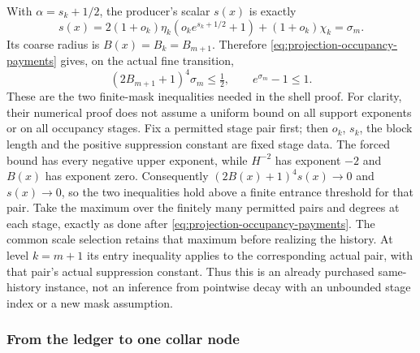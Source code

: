With $\alpha=s_k+1/2$, the producer's scalar $s(x)$ is exactly
\[
 s(x)=2(1+o_k)\eta_k(o_ke^{s_k+1/2}+1)+(1+o_k)\chi_k
      =\sigma_m.
\]
Its coarse radius is $B(x)=B_k=B_{m+1}$. Therefore
\eqref{eq:projection-occupancy-payments} gives, on the actual fine
transition,
\[
 (2B_{m+1}+1)^4\sigma_m\le\tfrac12,
             \qquad e^{\sigma_m}-1\le1.
\]
These are the two finite-mask inequalities needed in the shell proof.
For clarity, their numerical proof does not assume a uniform bound on
all support exponents or on all occupancy stages. Fix a permitted stage
pair first; then $o_k$, $s_k$, the block length and the positive
suppression constant are fixed stage data. The forced bound has every
negative upper exponent, while $H^{-2}$ has exponent $-2$ and $B(x)$
has exponent zero. Consequently $(2B(x)+1)^4s(x)\to0$ and
$s(x)\to0$, so the two inequalities hold above a finite entrance
threshold for that pair. Take the maximum over the finitely many
permitted pairs and degrees at each stage, exactly as done after
\eqref{eq:projection-occupancy-payments}. The common scale selection
retains that maximum before realizing the history. At level $k=m+1$
its entry inequality applies to the corresponding actual pair, with
that pair's actual suppression constant. Thus this is an already
purchased same-history instance, not an inference from pointwise decay
with an unbounded stage index or a new mask assumption.

\subsubsection{From the ledger to one collar node}

